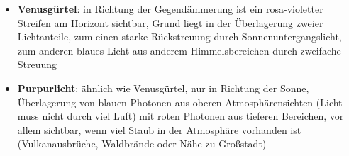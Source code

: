 \begin{itemize}
    \item
    \textbf{Venusgürtel}:
    in Richtung der Gegendämmerung ist ein rosa-violetter Streifen am Horizont
    sichtbar, Grund liegt in der Überlagerung zweier Lichtanteile,
    zum einen starke Rückstreuung durch Sonnenuntergangslicht,
    zum anderen blaues Licht aus anderem Himmelsbereichen durch zweifache
    Streuung
    
    \item
    \textbf{Purpurlicht}:
    ähnlich wie Venusgürtel, nur in Richtung der Sonne,
    Überlagerung von blauen Photonen aus oberen Atmosphärensichten
    (Licht muss nicht durch viel Luft) mit roten Photonen aus tieferen
    Bereichen, vor allem sichtbar, wenn viel Staub in der Atmosphäre vorhanden
    ist (Vulkanausbrüche, Waldbrände oder Nähe zu Großstadt)
\end{itemize}

\pagebreak
